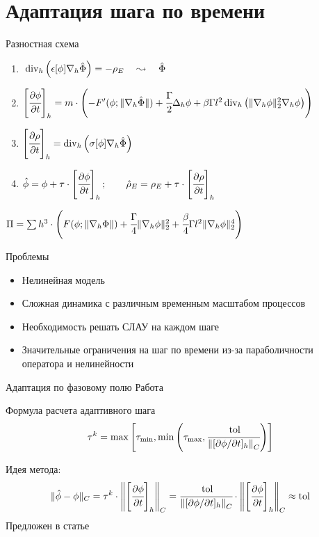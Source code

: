
\section{Адаптация шага по времени}

\begin{frame}{Разностная схема}
\vspace{-3mm}
\begin{enumerate}
	\item $\; \operatorname{{div}}_h \left( \epsilon[\phi] \nabla_h \hat{\Phi} \right) = - \rho_E \quad \leadsto \quad \hat{\Phi}$
	\item $\left[ \cfrac{\partial \phi}{\partial t} \right]_h = m \cdot \left( -F'( \phi; \| \nabla_h \hat{\Phi} \|) + \cfrac{\Gamma}{2} \Delta_h \phi + \beta \Gamma l^2 \operatorname{{div}}_h \left( \| \nabla_h \phi \|_2^2 \nabla_h \phi \right) \right)$
	\item $\left[ \cfrac{\partial \rho}{\partial t} \right]_h = \operatorname{{div}}_h \left( \sigma[\phi] \nabla_h \hat{\Phi} \right)$
	\item $\hat{\phi} = \phi + \tau \cdot \left[ \cfrac{\partial \phi}{\partial t} \right]_h; \qquad \hat{\rho}_E = \rho_E + \tau \cdot \left[ \cfrac{\partial \rho}{\partial t} \right]_h$
\end{enumerate}
\vspace{2mm}
\parind $\Pi = \sum h^3 \cdot \left( F(\phi; \| \nabla_h \Phi \|) + \cfrac{\Gamma}{4} \| \nabla_h \phi \|_2^2 + \cfrac{\beta}{4} \Gamma l^2 \| \nabla_h \phi \|_2^4 \right)$
\end{frame}


\begin{frame}{Проблемы}
\large
\begin{itemize}
	\setlength\itemsep{3mm}
	\item Нелинейная модель
	\item Сложная динамика с различным временным масштабом процессов
	\item Необходимость решать СЛАУ на каждом шаге
	\item Значительные ограничения на шаг по времени из-за параболичности оператора и нелинейности
\end{itemize}
\end{frame}


\begin{frame}{Адаптация по фазовому полю}
Работа \cite{ponomarev_adaptation}
\vspace{1mm}
\begin{block}{Формула расчета адаптивного шага}
	\[
		\tau^k = \max \left[ {\tau_{\min}}, \min \left( {\tau_{\max}}, \cfrac{\operatorname{{tol}}}{\left\| [\partial \phi / \partial t]_h \right\|_C} \right) \right]
	\]
\end{block}
\vspace{1mm}
\parind Идея метода:
\[
	\| \hat{\phi} - \phi \|_C = \tau^k \cdot \left\| \left[ \cfrac{\partial \phi}{\partial t} \right]_h \right\|_C = \cfrac{\operatorname{{tol}}}{\left\| [\partial \phi / \partial t]_h \right\|_C} \cdot \left\| \left[ \cfrac{\partial \phi}{\partial t} \right]_h \right\|_C \approx \operatorname{{tol}}
\]
\parind Предложен в статье \cite{li_time_step}
\end{frame}


